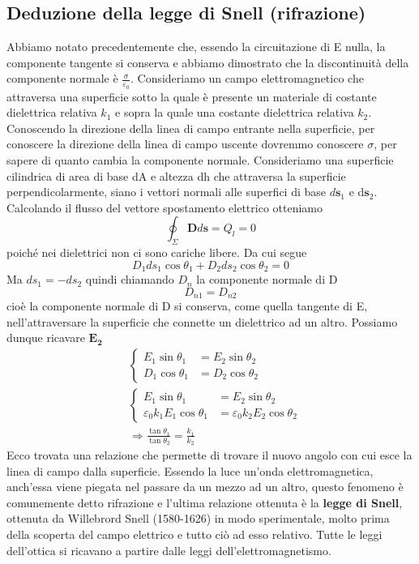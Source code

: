 \documentclass[
10pt, %
a4paper, %
oneside, %
headinclude,footinclude, %
BCOR5mm, %
]{scrartcl}
\begin{document}
\subsection{Deduzione della legge di Snell (rifrazione)}
Abbiamo notato precedentemente che, essendo la circuitazione di E nulla, la componente tangente si conserva e abbiamo dimostrato che la discontinuità della componente normale è $\frac{\sigma}{\varepsilon_0}$. Consideriamo un campo elettromagnetico che attraversa una superficie sotto la quale è presente un materiale di costante dielettrica relativa \(k_1\) e sopra la quale una costante dielettrica relativa \(k_2\). Conoscendo la direzione della linea di campo entrante nella superficie, per conoscere la direzione della linea di campo uscente dovremmo conoscere $\sigma$, per sapere di quanto cambia la componente normale. Consideriamo una superficie cilindrica di area di base dA e altezza dh che attraversa la superficie perpendicolarmente, siano i vettori normali alle superfici di base \(d\mathbf{s}_1\) e d\(\mathbf{s}_2\). Calcolando il flusso del vettore spostamento elettrico otteniamo
\[\oint_{\Sigma}\mathbf{D}d\mathbf{s} = Q_l = 0\]
poiché nei dielettrici non ci sono cariche libere. Da cui segue
\[D_1ds_1\cos\theta_1 + D_2ds_2\cos\theta_2 = 0\]
Ma \(ds_1 = -ds_2\) quindi chiamando \(D_n\) la componente normale di D
\[D_{n1} = D_{n2}\]
cioè la componente normale di D si conserva, come quella tangente di E, nell'attraversare la superficie che connette un dielettrico ad un altro. Possiamo dunque ricavare $\mathbf{E_2}$
\begin{align*}
	&\begin{cases}
		E_1\sin\theta_1 &= E_2\sin\theta_2 \\
		D_1\cos\theta_1 &= D_2\cos\theta_2 
	\end{cases}
\\
	&\begin{cases}
		E_1\sin\theta_1 &= E_2\sin\theta_2 \\
		\varepsilon_0k_1E_1\cos\theta_1 &= \varepsilon_0k_2E_2\cos\theta_2 
	\end{cases}
\\
	&\Rightarrow \frac{\tan\theta_1}{\tan\theta_2} = \frac{k_1}{k_2}
\end{align*}
Ecco trovata una relazione che permette di trovare il nuovo angolo con cui esce la linea di campo dalla superficie. Essendo la luce un'onda elettromagnetica, anch'essa viene piegata nel passare da un mezzo ad un altro, questo fenomeno è comunemente detto rifrazione e l'ultima relazione ottenuta è la \textbf{legge di Snell}, ottenuta da Willebrord Snell (1580-1626) in modo sperimentale, molto prima della scoperta del campo elettrico e tutto ciò ad esso relativo. Tutte le leggi dell'ottica si ricavano a partire dalle leggi dell'elettromagnetismo. 
\end{document}
